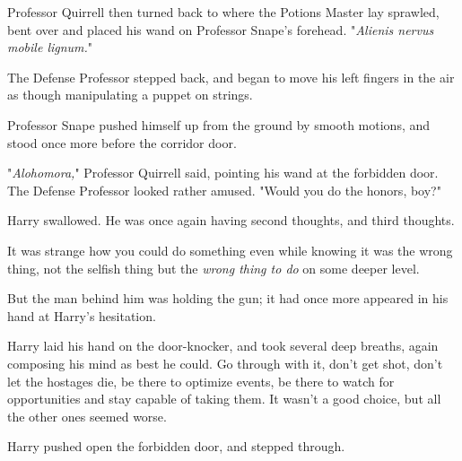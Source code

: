 Professor Quirrell then turned back to where the Potions Master lay sprawled, 
bent over and placed his wand on Professor Snape's forehead. "\emph{Alienis 
nervus mobile lignum.}"

The Defense Professor stepped back, and began to move his left fingers in the 
air as though manipulating a puppet on strings.

Professor Snape pushed himself up from the ground by smooth motions, and stood 
once more before the corridor door.

"\emph{Alohomora,}" Professor Quirrell said, pointing his wand at the forbidden 
door. The Defense Professor looked rather amused. "Would you do the honors, 
boy?"

Harry swallowed. He was once again having second thoughts, and third thoughts.

It was strange how you could do something even while knowing it was the wrong 
thing, not the selfish thing but the \emph{wrong thing to do} on some deeper 
level.

But the man behind him was holding the gun; it had once more appeared in his 
hand at Harry's hesitation.

Harry laid his hand on the door-knocker, and took several deep breaths, again 
composing his mind as best he could. Go through with it, don't get shot, don't 
let the hostages die, be there to optimize events, be there to watch for 
opportunities and stay capable of taking them. It wasn't a good choice, but all 
the other ones seemed worse.

Harry pushed open the forbidden door, and stepped through.
